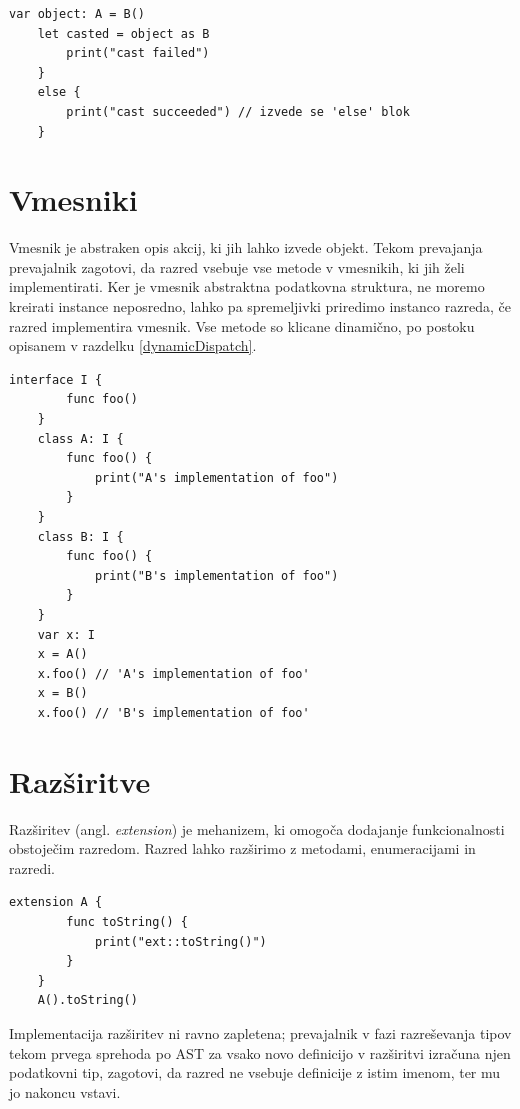 \documentclass[a4paper, 12p]{book}
\begin{document}
\begin{lstlisting}[caption={Pretvorba za razrede iz sheme ~\ref{vtables}.}, captionpos=b]
	var object: A = B()
	let casted = object as B
	    print("cast failed")
	}
	else {
	    print("cast succeeded") // izvede se 'else' blok
	}
\end{lstlisting}

\section{Vmesniki}

Vmesnik je abstraken opis akcij, ki jih lahko izvede objekt. Tekom prevajanja prevajalnik zagotovi, da razred vsebuje vse metode v vmesnikih, ki jih želi implementirati. Ker je vmesnik abstraktna podatkovna struktura, ne moremo kreirati instance neposredno, lahko pa spremeljivki priredimo instanco razreda, če razred implementira vmesnik. Vse metode so klicane dinamično, po postoku opisanem v razdelku \ref{dynamicDispatch}.

\begin{lstlisting}[caption={Vmesniki.}, label={lst:interfaces}, captionpos=b]
	interface I {
	    func foo()
	}
	class A: I {
	    func foo() {
	        print("A's implementation of foo")
	    }
	}
	class B: I {
	    func foo() {
	        print("B's implementation of foo")
	    }
	}
	var x: I
	x = A()
	x.foo() // 'A's implementation of foo'
	x = B()
	x.foo() // 'B's implementation of foo'
\end{lstlisting}

\section{Razširitve}

Razširitev (angl. \textit{extension}) je mehanizem, ki omogoča dodajanje funkcionalnosti obstoječim razredom. Razred lahko razširimo z metodami, enumeracijami in razredi.  

\begin{lstlisting}[caption={Razširitev razreda A.}, captionpos=b]
	extension A {
	    func toString() {
	        print("ext::toString()")
	    }
	}
	A().toString()
\end{lstlisting}

Implementacija razširitev ni ravno zapletena; prevajalnik v fazi razreševanja tipov tekom prvega sprehoda po AST za vsako novo definicijo v razširitvi izračuna njen podatkovni tip, zagotovi, da razred ne vsebuje definicije z istim imenom, ter mu jo nakoncu vstavi.
\end{document}
